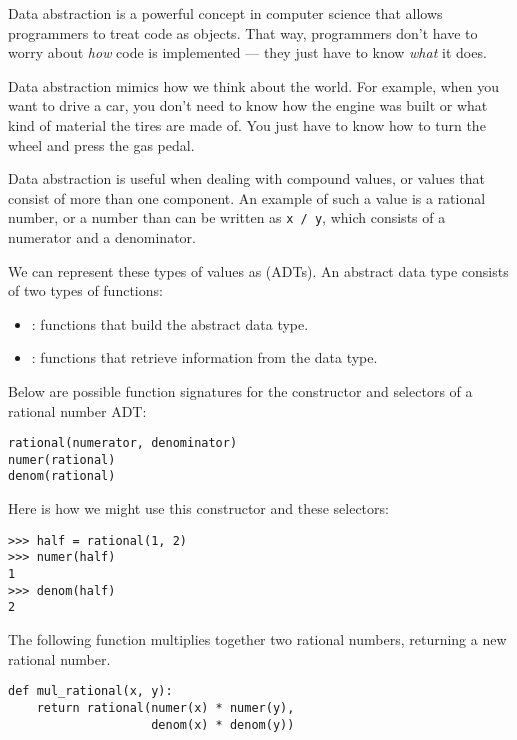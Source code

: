 Data abstraction is a powerful concept in computer science that allows
programmers to treat code as objects. That way, programmers don't have to worry
about \emph{how} code is implemented --- they just have to know \emph{what} it
does.

Data abstraction mimics how we think about the world. For example, when you
want to drive a car, you don't need to know how the engine was built or what
kind of material the tires are made of.  You just have to know how to turn the
wheel and press the gas pedal.

Data abstraction is useful when dealing with compound values, or values that
consist of more than one component. An example of such a value is a rational
number, or a number than can be written as {\tt x / y}, which consists of a
numerator and a denominator.

We can represent these types of values as  (ADTs).
An abstract data type consists of two types of functions:
\begin{itemize}
\item
{}: functions that build the abstract data type.
\item
{}: functions that retrieve information from the data type.
\end{itemize}

Below are possible function signatures for the constructor and selectors of a
rational number ADT:

\begin{lstlisting}
rational(numerator, denominator)
numer(rational)
denom(rational)
\end{lstlisting}

Here is how we might use this constructor and these selectors:

\begin{lstlisting}
>>> half = rational(1, 2)
>>> numer(half)
1
>>> denom(half)
2
\end{lstlisting}

The following function multiplies together two rational numbers, returning a
new rational number.

\begin{lstlisting}
def mul_rational(x, y):
    return rational(numer(x) * numer(y),
                    denom(x) * denom(y))
\end{lstlisting}
